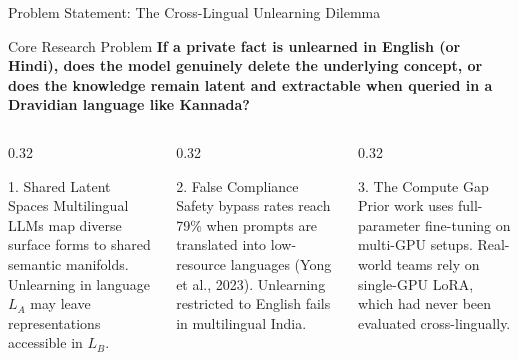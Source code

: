 \documentclass[aspectratio=169,10pt]{beamer}
\begin{document}
\begin{frame}{Problem Statement: The Cross-Lingual Unlearning Dilemma}
  \begin{alertblock}{Core Research Problem}
    \small \textbf{If a private fact is unlearned in English (or Hindi), does the model genuinely delete the underlying concept, or does the knowledge remain latent and extractable when queried in a Dravidian language like Kannada?}
  \end{alertblock}
  \vspace{0.4em}
  \begin{columns}[T]
    \begin{column}{0.32\textwidth}
      \begin{block}{1. Shared Latent Spaces}
        \scriptsize Multilingual LLMs map diverse surface forms to shared semantic manifolds. Unlearning in language $L_A$ may leave representations accessible in $L_B$.
      \end{block}
    \end{column}
    \begin{column}{0.32\textwidth}
      \begin{block}{2. False Compliance}
        \scriptsize Safety bypass rates reach 79\% when prompts are translated into low-resource languages (Yong et al., 2023). Unlearning restricted to English fails in multilingual India.
      \end{block}
    \end{column}
    \begin{column}{0.32\textwidth}
      \begin{block}{3. The Compute Gap}
        \scriptsize Prior work uses full-parameter fine-tuning on multi-GPU setups. Real-world teams rely on single-GPU LoRA, which had never been evaluated cross-lingually.
      \end{block}
    \end{column}
  \end{columns}
\end{frame}
\end{document}
